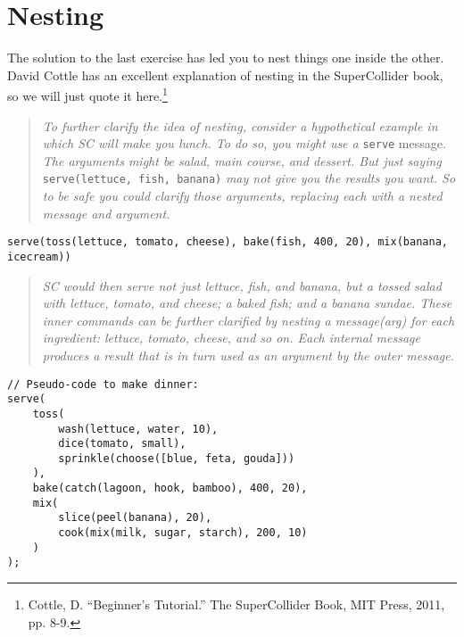 \section{Nesting}
\label{sec:nesting}

The solution to the last exercise has led you to nest things one inside the other. David Cottle has an excellent explanation of nesting in the SuperCollider book, so we will just quote it here.\footnote{Cottle, D. ``Beginner's Tutorial.'' The SuperCollider Book, MIT Press, 2011, pp. 8-9.}

\begin{quotation}
\textit{To further clarify the idea of nesting, consider a hypothetical example in which SC will make you lunch. To do so, you might use a} \texttt{serve} message. \textit{The arguments might be salad, main course, and dessert. But just saying} \texttt{serve(lettuce, fish, banana)} \textit{may not give you the results you want. So to be safe you could clarify those arguments, replacing each with a nested message and argument.}
\end{quotation}

\texttt{serve(toss(lettuce, tomato, cheese), bake(fish, 400, 20), mix(banana, icecream))
}
\begin{quotation}
\textit{SC would then serve not just lettuce, fish, and banana, but a tossed salad with lettuce, tomato, and cheese; a baked fish; and a banana sundae. These inner commands can be further clarified by nesting a message(arg) for each ingredient: lettuce, tomato, cheese, and so on. Each internal message produces a result that is in turn used as an argument by the outer message.}
\end{quotation}

\begin{lstlisting}[style=SuperCollider-IDE, basicstyle=\scttfamily\footnotesize, label=code-dinner]
// Pseudo-code to make dinner: 
serve(
	toss(
		wash(lettuce, water, 10),
		dice(tomato, small),
		sprinkle(choose([blue, feta, gouda]))
	),
	bake(catch(lagoon, hook, bamboo), 400, 20),
	mix(
		slice(peel(banana), 20),
		cook(mix(milk, sugar, starch), 200, 10)
	)
);
\end{lstlisting}

